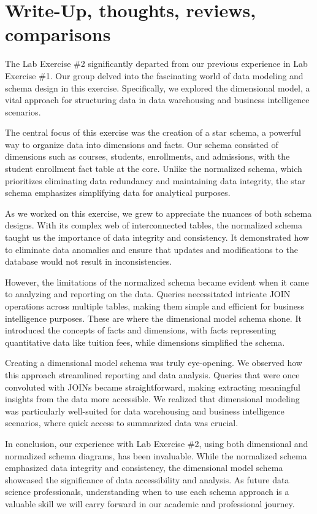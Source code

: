 \chapter{Write-Up, thoughts, reviews, comparisons}

The Lab Exercise \#2 significantly departed from our previous experience in Lab Exercise \#1. Our group delved into the fascinating world of data modeling and schema design in this exercise. Specifically, we explored the dimensional model, a vital approach for structuring data in data warehousing and business intelligence scenarios.

The central focus of this exercise was the creation of a star schema, a powerful way to organize data into dimensions and facts. Our schema consisted of dimensions such as courses, students, enrollments, and admissions, with the student enrollment fact table at the core. Unlike the normalized schema, which prioritizes eliminating data redundancy and maintaining data integrity, the star schema emphasizes simplifying data for analytical purposes.

As we worked on this exercise, we grew to appreciate the nuances of both schema designs. With its complex web of interconnected tables, the normalized schema taught us the importance of data integrity and consistency. It demonstrated how to eliminate data anomalies and ensure that updates and modifications to the database would not result in inconsistencies.

However, the limitations of the normalized schema became evident when it came to analyzing and reporting on the data. Queries necessitated intricate JOIN operations across multiple tables, making them simple and efficient for business intelligence purposes. These are where the dimensional model schema shone. It introduced the concepts of facts and dimensions, with facts representing quantitative data like tuition fees, while dimensions simplified the schema.

Creating a dimensional model schema was truly eye-opening. We observed how this approach streamlined reporting and data analysis. Queries that were once convoluted with JOINs became straightforward, making extracting meaningful insights from the data more accessible. We realized that dimensional modeling was particularly well-suited for data warehousing and business intelligence scenarios, where quick access to summarized data was crucial.

In conclusion, our experience with Lab Exercise \#2, using both dimensional and normalized schema diagrams, has been invaluable. While the normalized schema emphasized data integrity and consistency, the dimensional model schema showcased the significance of data accessibility and analysis. As future data science professionals, understanding when to use each schema approach is a valuable skill we will carry forward in our academic and professional journey.

